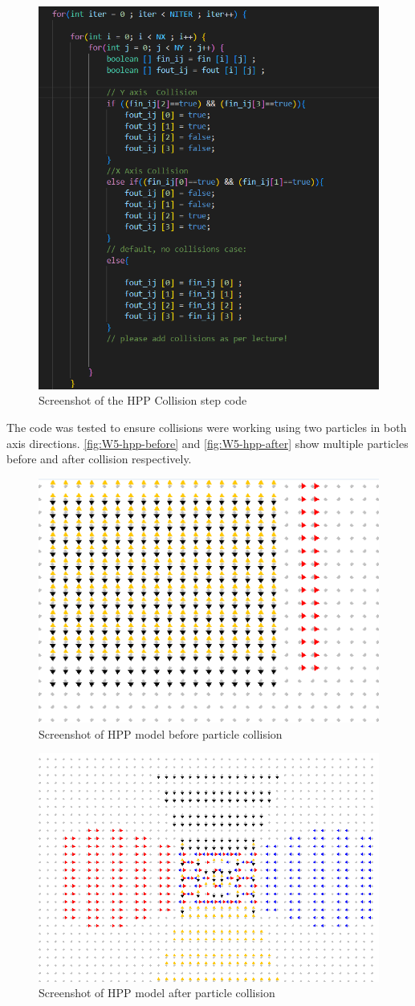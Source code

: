 \begin{figure}[H] 
    \centering
    \includegraphics[width=0.59\columnwidth]{Figures/Week 5/HPP Collision Step code.png}
    \caption{Screenshot of the HPP Collision step code}
    \label{fig:W5-collision-step-code}
\end{figure}

The code was tested to ensure collisions were working using two particles in both axis directions. \autoref{fig:W5-hpp-before} and \autoref{fig:W5-hpp-after} show multiple particles before and after collision respectively.


\begin{figure}[H] 
    \centering
    \includegraphics[width=0.49\columnwidth]{Figures/Week 5/HPP Mega Collision before.png}
    \caption{Screenshot of HPP model before particle collision}
    \label{fig:W5-hpp-before}
\end{figure}


\begin{figure}[H] 
    \centering
    \includegraphics[width=0.49\columnwidth]{Figures/Week 5/HPP Mega Collision After.png}
    \caption{Screenshot of HPP model after particle collision}
    \label{fig:W5-hpp-after}
\end{figure}
%
%

